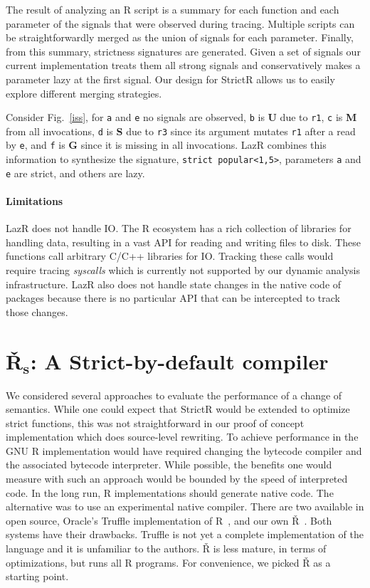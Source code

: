 \documentclass[screen,acmsmall]{acmart}
\renewcommand{\c}[1]{\lstinline |#1|\xspace}
\newcommand{\strictr}{{\sf StrictR}\xspace}
\newcommand{\lazr}{{\sf LazR}\xspace}
\renewcommand{\Rsh}{{\sf\v R}\xspace}
\begin{document}
The result of analyzing an R script is a summary for each function and each
parameter of the signals that were observed during tracing. Multiple scripts can
be straightforwardly merged as the union of signals for each parameter. Finally,
from this summary, strictness signatures are generated. Given a set of signals
our current implementation treats them all strong signals and conservatively
makes a parameter lazy at the first signal. Our design for \strictr allows us to
easily explore different merging strategies.


Consider Fig.~\ref{iss}, for \c a and \c e no signals are observed, \c b is
\textbf{U} due to \c{r1}, \c c is \textbf{M} from all invocations, \c d is
\textbf{S} due to \c{r3} since its argument mutates \c{r1} after a read by \c e,
and \c f is \textbf{G} since it is missing in all invocations. \lazr combines
this information to synthesize the signature, \texttt{strict popular<1,5>},
parameters \c a and \c e are strict, and others are lazy.


\paragraph{Limitations}
\lazr does not handle IO. The R ecosystem has a rich collection of libraries for
handling data, resulting in a vast API for reading and writing files to disk.
These functions call arbitrary C/C++ libraries for IO. Tracking these calls
would require tracing \emph{syscalls} which is currently not supported by our
dynamic analysis infrastructure. \lazr also does not handle state changes in the
native code of packages because there is no particular API that can be
intercepted to track those changes.

\section{\v R$_{\mathbf s}$: A Strict-by-default compiler}\label{sec:rsh1}

We considered several approaches to evaluate the performance of a change of
semantics. While one could expect that \strictr would be extended to optimize
strict functions, this was not straightforward in our proof of concept
implementation which does source-level rewriting. To achieve performance in the
GNU R implementation would have required changing the bytecode compiler and the
associated bytecode interpreter. While possible, the benefits one would measure
with such an approach would be bounded by the speed of interpreted code. In the long
run, R implementations should generate native code. The alternative was to use
an experimental native compiler. There are two available in open source,
Oracle's Truffle implementation of R~\cite{Stadler16}, and our own
\Rsh~\cite{dls19}. Both systems have their drawbacks. Truffle is not yet a
complete implementation of the language and it is unfamiliar to the authors.
\Rsh is less mature, in terms of optimizations, but runs all R programs. For
convenience, we picked \Rsh as a starting point.
\end{document}

